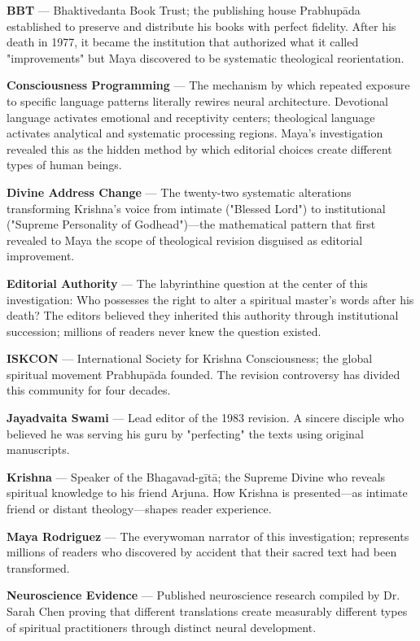 \documentclass[12pt,twoside]{book}
\begin{document}
\textbf{\textbf{BBT}} — Bhaktivedanta Book Trust; the publishing house Prabhupāda established to preserve and distribute his books with perfect fidelity. After his death in 1977, it became the institution that authorized what it called "improvements" but Maya discovered to be systematic theological reorientation.

\textbf{\textbf{Consciousness Programming}} — The mechanism by which repeated exposure to specific language patterns literally rewires neural architecture. Devotional language activates emotional and receptivity centers; theological language activates analytical and systematic processing regions. Maya's investigation revealed this as the hidden method by which editorial choices create different types of human beings.

\textbf{\textbf{Divine Address Change}} — The twenty-two systematic alterations transforming Krishna's voice from intimate ("Blessed Lord") to institutional ("Supreme Personality of Godhead")—the mathematical pattern that first revealed to Maya the scope of theological revision disguised as editorial improvement.

\textbf{\textbf{Editorial Authority}} — The labyrinthine question at the center of this investigation: Who possesses the right to alter a spiritual master's words after his death? The editors believed they inherited this authority through institutional succession; millions of readers never knew the question existed.

\textbf{\textbf{ISKCON}} — International Society for Krishna Consciousness; the global spiritual movement Prabhupāda founded. The revision controversy has divided this community for four decades.

\textbf{\textbf{Jayadvaita Swami}} — Lead editor of the 1983 revision. A sincere disciple who believed he was serving his guru by "perfecting" the texts using original manuscripts.

\textbf{\textbf{Krishna}} — Speaker of the Bhagavad-gītā; the Supreme Divine who reveals spiritual knowledge to his friend Arjuna. How Krishna is presented—as intimate friend or distant theology—shapes reader experience.

\textbf{\textbf{Maya Rodriguez}} — The everywoman narrator of this investigation; represents millions of readers who discovered by accident that their sacred text had been transformed.

\textbf{\textbf{Neuroscience Evidence}} — Published neuroscience research compiled by Dr. Sarah Chen proving that different translations create measurably different types of spiritual practitioners through distinct neural development.
\end{document}
